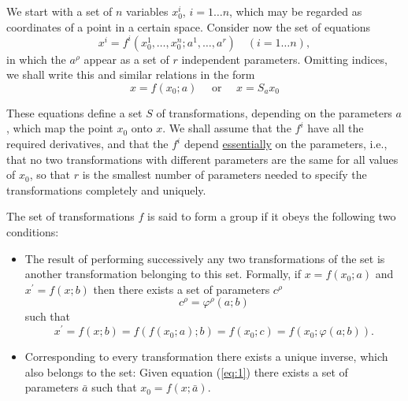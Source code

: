 
We start with a set of \(n\) variables \(x_0^i\), \(i=1 \ldots n\), which may be
regarded as coordinates of a point in a certain space. Consider now the set of equations
\begin{equation}\label{eq:1}
x^i=f^i\left(x_0^1, \ldots, x_0^n ; a^1, \ldots, a^r\right) \quad(i=1 \ldots n),
\end{equation}
in which the \(a^\rho\) appear as a set of \(r\) independent parameters.
Omitting indices, we shall write this and similar relations in the form
\[
x=f\left(x_0 ; a\right) \quad \text { or } \quad x=S_a x_0 \tag{1'}
\]

These equations define a set \(S\) of transformations, depending on the
parameters \(a\), which map the point \(x_0\) onto \(x\). We shall assume
that the \(f^i\) have all the required derivatives, and that the \(f^i\) depend
\underline{essentially}
on the parameters, i.e., that no two transformations with different
parameters are the same for all values of \(x_0\), so that \(r\) is the
smallest number of parameters needed to specify the transformations completely
and uniquely.


The set of transformations \(f\) is said to form a group if it obeys the
following two conditions:
\begin{itemize}
\item [i)]
The result of performing successively any two transformations of the set is
another transformation belonging to this set. Formally, if
\(x=f\left(x_0 ; a\right)\) and \(x^{\prime}=f(x ; b)\)
then there exists a set of parameters \(c^\rho\)
\begin{equation}\label{eq:2}
c^\rho=\varphi^\rho(a ; b)
\end{equation}
such that
\begin{equation}\label{eq:3}
x^{\prime}=f(x ; b)=f\left(f(x_0; a) ; b\right)=f(x_0 ; c)=f(x_0 ; \varphi(a ; b)).
\end{equation}
\item [ii)]
Corresponding to every transformation there exists a unique inverse, which also
belongs to the set: Given equation (\ref{eq:1}) there exists a set of
parameters \(\bar{a}\) such that \(x_0=f(x ;\bar{a})\).
\end{itemize}

